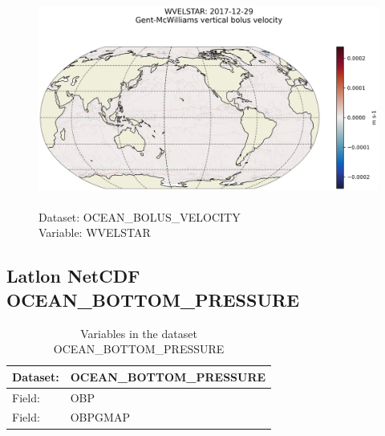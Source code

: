 \begin{figure}[H]
\centering
\includegraphics[scale=0.5]{../images/plots/latlon_plots/Gent-McWilliams_Ocean_Bolus_Velocity/WVELSTAR.png}
\caption{\\Dataset: OCEAN\_BOLUS\_VELOCITY\\Variable: WVELSTAR}
\label{tab:table-OCEAN_BOLUS_VELOCITY_WVELSTAR-Plot}
\end{figure}
\pagebreak
\subsection{Latlon NetCDF OCEAN\_BOTTOM\_PRESSURE}
\newp
\begin{longtable}{|p{}|p{}|}
\caption{Variables in the dataset OCEAN\_BOTTOM\_PRESSURE}
\label{tab:table-OCEAN_BOTTOM_PRESSURE-fields} \\ 
\hline \endhead \hline \endfoot
\rowcolor{lightgray} \textbf{Dataset:} & \textbf{OCEAN\_BOTTOM\_PRESSURE} \\ \hline
Field: &OBP \\ \hline
Field: &OBPGMAP \\ \hline
\end{longtable}

\pagebreak
